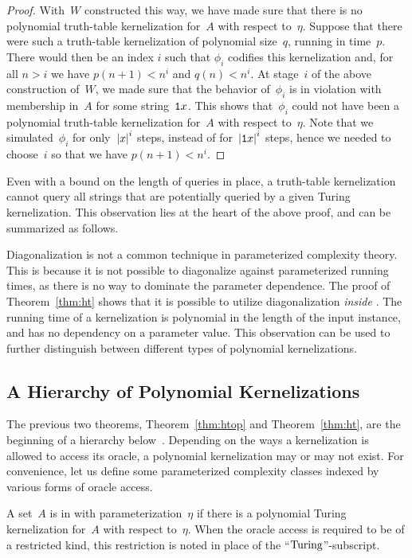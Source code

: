 \begin{proof}
  With~$W$ constructed this way, we have made sure that there is no polynomial truth-table kernelization for~$A$ with respect to~$\eta$.
  Suppose that there were such a truth-table kernelization of polynomial size~$q$, running in time~$p$.
  There would then be an index $i$ such that $\phi_i$ codifies this kernelization and, for all $n > i$ we have $p(n + 1) < n^i$ and $q(n) < n^i$.
  At stage~$i$ of the above construction of~$W$, we made sure that the behavior of~$\phi_i$ is in violation with membership in~$A$ for some string~$\textnormal{\texttt{1}}x$.
  This shows that~$\phi_i$ could not have been a polynomial truth-table kernelization for~$A$ with respect to~$\eta$.
  Note that we simulated~$\phi_i$ for only~${\lvert x\rvert}^i$ steps, instead of for~${\lvert\textnormal{\texttt{1}}x\rvert}^i$ steps, hence we needed to choose~$i$ so that we have $p(n + 1) < n^i$.
\end{proof}

Even with a bound on the length of queries in place, a truth-table kernelization cannot query all strings that are potentially queried by a given Turing kernelization.
This observation lies at the heart of the above proof, and can be summarized as follows.

Diagonalization is not a common technique in parameterized complexity theory.
This is because it is not possible to diagonalize against parameterized running times, as there is no way to dominate the parameter dependence.
The proof of Theorem~\ref{thm:ht} shows that it is possible to utilize diagonalization \emph{inside} .
The running time of a kernelization is polynomial in the length of the input instance, and has no dependency on a parameter value.
This observation can be used to further distinguish between different types of polynomial kernelizations.

\subsection{A Hierarchy of Polynomial Kernelizations}
\label{sec:redundancy:hierarchy}%
The previous two theorems, Theorem~\ref{thm:htop} and Theorem~\ref{thm:ht}, are the beginning of a hierarchy below~.
Depending on the ways a kernelization is allowed to access its oracle, a polynomial kernelization may or may not exist.
For convenience, let us define some parameterized complexity classes indexed by various forms of oracle access.
\begin{definition}
  A set~$A$ is in  with parameterization~$\eta$ if there is a polynomial Turing kernelization for~$A$ with respect to~$\eta$.
  When the oracle access is required to be of a restricted kind, this restriction is noted in place of the \enquote{$\textnormal{Turing}$}-subscript.
\end{definition}

